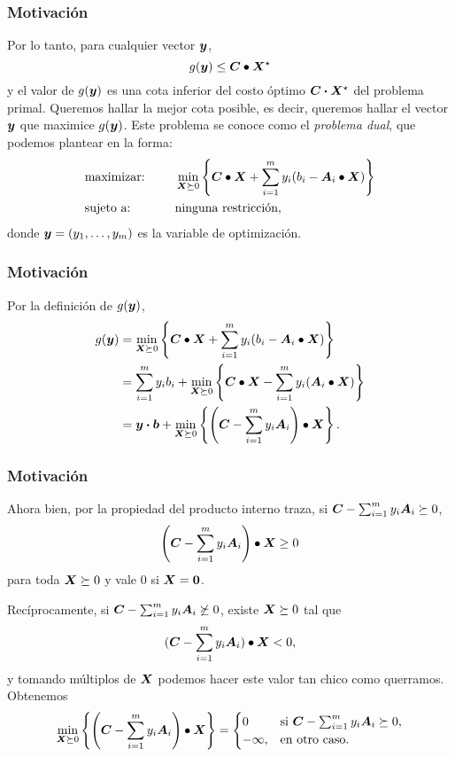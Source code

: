 \documentclass[aspectratio=169,12pt,spanish]{beamer}
\begin{document}
\begin{frame}
\frametitle{Motivación}

Por lo tanto, para cualquier vector $\bm{y}$,
$$g(\bm{y}) \le \bm{C} \bullet \bm{X}^\star$$
y el valor de $g(\bm{y})$ es una cota inferior del costo óptimo $\bm{C} \boldsymbol{\cdot} \bm{X}^\star$ del problema primal. Queremos hallar la mejor cota posible, es decir, queremos hallar el vector $\bm{y}$ que maximice $g(\bm{y})$. Este problema se conoce como el \emph{problema dual}, que podemos plantear en la forma:
\begin{alignat*}{2}
  & \text{maximizar: } & & \min_{\bm{X} \succeq 0} \left\{ \bm{C} \bullet \bm{X} + \sum_{i=1}^m y_i (b_i - \bm{A}_i \bullet \bm{X}) \right\} \\
   & \text{sujeto a: } & \quad & \text{ninguna restricción},
\end{alignat*}
donde $\bm{y} = (y_1, \dots, y_m)$ es la variable de optimización.
\end{frame}


\begin{frame}
\frametitle{Motivación}

Por la definición de $g(\bm{y})$,
$$
\begin{aligned}
g(\bm{y}) &= \min_{\bm{X} \succeq 0} \left\{ \bm{C} \bullet \bm{X} + \sum_{i=1}^m y_i (b_i - \bm{A}_i \bullet \bm{X})\right\} \\
&= \sum_{i=1}^m y_i b_i + \min_{\bm{X} \succeq 0} \left\{ \bm{C} \bullet \bm{X} - \sum_{i=1}^m y_i (\bm{A}_i \bullet \bm{X}) \right\} \\
&= \bm{y} \boldsymbol{\cdot} \bm{b} + \min_{\bm{X} \succeq 0} \left\{ \left(\bm{C} - \sum_{i=1}^m y_i \bm{A}_i\right) \bullet \bm{X} \right\}. \\
\end{aligned}
$$

\end{frame}


\begin{frame}
\frametitle{Motivación}

Ahora bien, por la propiedad del producto interno traza, si $\bm{C} - \sum_{i=1}^m y_i \bm{A}_i \succeq 0$,
$$\left(\bm{C} - \sum_{i=1}^m y_i \bm{A}_i\right) \bullet \bm{X} \ge 0$$
para toda $\bm{X} \succeq 0$ y vale 0 si $\bm{X} = \bm{0}$.

Recíprocamente, si $\bm{C} - \sum_{i=1}^m y_i \bm{A}_i \not\succeq 0$, existe $\bm{X} \succeq 0$ tal que
$$(\bm{C} - \sum_{i=1}^m y_i \bm{A}_i) \bullet \bm{X} < 0,$$
y tomando múltiplos de $\bm{X}$ podemos hacer este valor tan chico como querramos. Obtenemos
$$\min_{\bm{X} \succeq 0} \left\{ \left(\bm{C} - \sum_{i=1}^m y_i \bm{A}_i\right) \bullet \bm{X} \right\} = \begin{cases}
0 & \text{si } \bm{C} - \sum_{i=1}^m y_i \bm{A}_i \succeq 0, \\
-\infty, & \text{en otro caso.}\end{cases}
$$

\end{frame}
\end{document}
